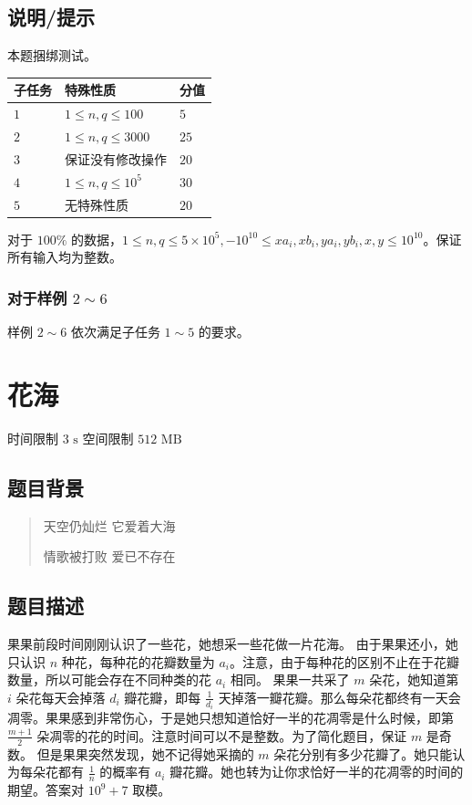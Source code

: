 \documentclass[12pt,a4paper,oneside]{ctexart}
\begin{document}
\subsection*{说明/提示}
本题捆绑测试。
\begin{center}\small
\begin{tabularx}{\textwidth}{|>{\centering\arraybackslash}X|>{\centering\arraybackslash}X|>{\centering\arraybackslash}X|}\hline
子任务 & 特殊性质 & 分值\\\hline
$1$ & $1 \le n,q \le 100$ & $5$\\\hline
$2$ & $1 \le n,q \le 3000$ & $25$\\\hline
$3$ & 保证没有修改操作 & $20$\\\hline
$4$ & $1 \le n,q \le 10^5$ & $30$\\\hline
$5$ & 无特殊性质 & $20$\\\hline
\end{tabularx}
\end{center}
对于 $100\%$ 的数据，$1 \le n,q \le 5 \times 10^5,-10^{10} \le xa_i,xb_i,ya_i,yb_i,x,y \le 10^{10}$。保证所有输入均为整数。
\subsubsection*{对于样例 $2 \sim 6$}
样例 $2 \sim 6$ 依次满足子任务 $1 \sim 5$ 的要求。
\newpage\section{花海}
时间限制 $\text{3 s}$
空间限制 $\text{512 MB}$
\subsection*{题目背景}
\begin{quote}
天空仍灿烂 它爱着大海

情歌被打败 爱已不存在
\end{quote}
\subsection*{题目描述}
果果前段时间刚刚认识了一些花，她想采一些花做一片花海。
由于果果还小，她只认识 $n$ 种花，每种花的花瓣数量为 $a_i$。注意，由于每种花的区别不止在于花瓣数量，所以可能会存在不同种类的花 $a_i$ 相同。
果果一共采了 $m$ 朵花，她知道第 $i$ 朵花每天会掉落 $d_i$ 瓣花瓣，即每 $\frac{1}{d_i}$ 天掉落一瓣花瓣。那么每朵花都终有一天会凋零。果果感到非常伤心，于是她只想知道恰好一半的花凋零是什么时候，即第 $\frac{m+1}{2}$ 朵凋零的花的时间。注意时间可以不是整数。为了简化题目，保证 $m$ 是奇数。
但是果果突然发现，她不记得她采摘的 $m$ 朵花分别有多少花瓣了。她只能认为每朵花都有 $\frac{1}{n}$ 的概率有 $a_i$ 瓣花瓣。她也转为让你求恰好一半的花凋零的时间的期望。答案对 $10^9+7$ 取模。
\end{document}

